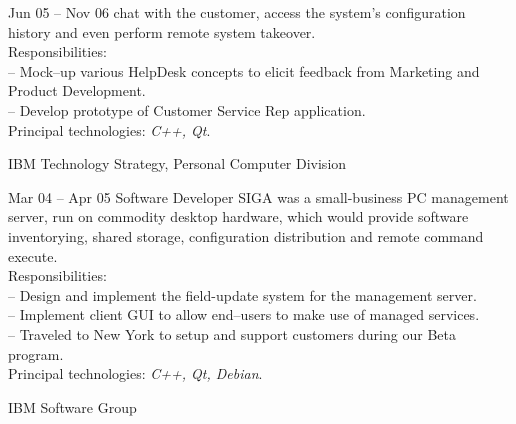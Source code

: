 \documentclass[letterpaper, 11pt]{article}
\begin{document}
\begin{resume}
\begin{block}
\begin{subcategory}{Jun 05 -- Nov 06}
                chat with the customer, access the system's configuration history and even
                perform remote system takeover.
                \\[1ex]
                Responsibilities: \\
                -- Mock--up various HelpDesk concepts to elicit feedback from Marketing and Product Development. \\
                -- Develop prototype of Customer Service Rep application.
                \\[1ex]
                Principal technologies: \emph{C++, Qt}.
                \bigskip
                \bigskip
            \end{subcategory}
        \end{block}
        \begin{block}
            \begin{category}{IBM}
                 {Technology Strategy, Personal Computer Division}
                \smallskip
            \end{category}
            \begin{subcategory}{Mar 04 -- Apr 05}
                 {Software Developer}
                SIGA was a small-business PC management server, run on commodity desktop
                hardware, which would provide software inventorying, shared storage,
                configuration distribution and remote command execute.
                \\[1ex]
                Responsibilities: \\
                -- Design and implement the field-update system for the management server. \\
                -- Implement client GUI to allow end--users to make use of managed services. \\
                -- Traveled to New York to setup and support customers during our Beta program.
                \\[1ex]
                Principal technologies: \emph{C++, Qt, Debian}.
                \bigskip
                \bigskip
            \end{subcategory}
        \end{block}
        \begin{block}
            \begin{category}{IBM}
                 {Software Group}

\end{category}
\end{block}
\end{resume}
\end{document}
